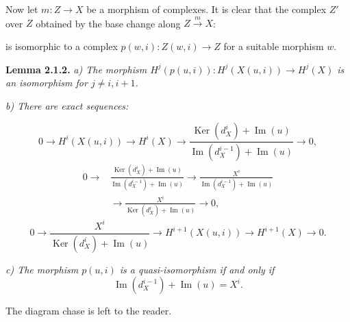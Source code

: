 \clearpage
{}%
\begingroup\small\setlength{\parskip}{0pt}\setlength{\emergencystretch}{1.5em}
\setlength{\abovedisplayskip}{4pt plus 2pt minus 2pt}%
\setlength{\belowdisplayskip}{4pt plus 2pt minus 2pt}%

Now let $m\colon Z\longrightarrow X$ be a morphism of complexes. It is
clear that the complex $Z'$ over $Z$ obtained by the base change along
$Z\xrightarrow{m}X$:

\begin{center}
\end{center}
is isomorphic to a complex
$p(w,i)\colon Z(w,i)\longrightarrow Z$ for a suitable morphism $w$.

\medskip\noindent\textbf{Lemma 2.1.2.}\quad
\textit{a) The morphism
$H^j(p(u,i))\colon H^j(X(u,i))\longrightarrow H^j(X)$ is an
isomorphism for $j\neq i,i+1$.}

\noindent\textit{b) There are exact sequences:}

\[
0\longrightarrow H^i(X(u,i))\longrightarrow H^i(X)
\longrightarrow
\frac{\operatorname{Ker}(d_X^i)+\operatorname{Im}(u)}
 {\operatorname{Im}(d_X^{i-1})+\operatorname{Im}(u)}
\longrightarrow0,
\]
\[
\begin{aligned}
0\longrightarrow{}&
\frac{\operatorname{Ker}(d_X^i)+\operatorname{Im}(u)}
 {\operatorname{Im}(d_X^{i-1})+\operatorname{Im}(u)}
\longrightarrow
\frac{X^i}{\operatorname{Im}(d_X^{i-1})+\operatorname{Im}(u)}\\
&\longrightarrow
\frac{X^i}{\operatorname{Ker}(d_X^i)+\operatorname{Im}(u)}
\longrightarrow0,
\end{aligned}
\]
\[
0\longrightarrow
\frac{X^i}{\operatorname{Ker}(d_X^i)+\operatorname{Im}(u)}
\longrightarrow H^{i+1}(X(u,i))
\longrightarrow H^{i+1}(X)\longrightarrow0.
\]

\noindent\textit{c) The morphism $p(u,i)$ is a quasi-isomorphism if
and only if}
\[
\operatorname{Im}(d_X^{i-1})+\operatorname{Im}(u)=X^i.
\]

The diagram chase is left to the reader.

